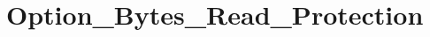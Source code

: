 \hypertarget{group___option___bytes___read___protection}{\section{Option\-\_\-\-Bytes\-\_\-\-Read\-\_\-\-Protection}
\label{group___option___bytes___read___protection}
}
